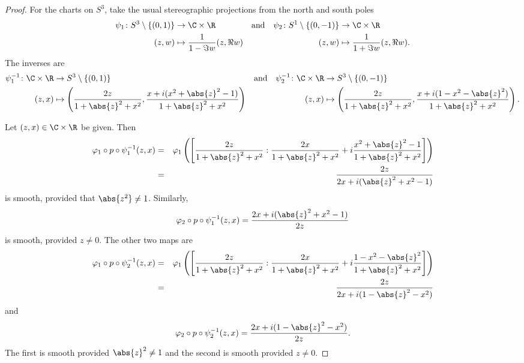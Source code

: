\documentclass[10pt]{amsart}
\begin{document}
\begin{thm}
\begin{proof}
    For the charts on $S^3$, take the usual stereographic projections from the north and south poles
    \begin{align*}
      \psi_1 \colon S^3 \setminus \left\{(0, 1)\right\} &\rightarrow \C \times \R& \text{and} & & \psi_2 \colon S^1 \setminus \left\{(0, -1)\right\} & \rightarrow \C \times \R\\
             (z, w) & \mapsto \frac{1}{1 - \Im{w}}(z, \Re{w}) & & & (z, w) & \mapsto \frac{1}{1 + \Im{w}}(z, \Re{w}).
    \end{align*}
    The inverses are
    \begin{align*}
      \psi_1^{-1} \colon \C \times \R &\rightarrow S^3 \setminus \left\{(0,1)\right\} & \text{and} & & \psi_2^{-1} \colon \C \times \R & \rightarrow S^3 \setminus \left\{(0,-1)\right\}\\
      (z,x) & \mapsto \left(\frac{2z}{1 + \abs{z}^2 + x^2}, \frac{x + i(x^2 + \abs{z}^2 - 1)}{1 + \abs{z}^2 + x^2}\right) & & & (z,x) & \mapsto \left(\frac{2z}{1 + \abs{z}^2 + x^2}, \frac{x + i(1 - x^2 - \abs{z}^2)}{1 + \abs{z}^2 + x^2}\right).%
    \end{align*}

    Let $(z,x) \in \C \times \R$ be given.
    Then 
    \begin{eqnarray*}
      \varphi_1 \circ p \circ \psi_1^{-1}(z,x) &=& \varphi_1\left(\left[\frac{2z}{1 + \abs{z}^2 + x^2} : \frac{2x}{1 + \abs{z}^2 + x^2} + i\frac{x^2 + \abs{z}^2 - 1}{1 + \abs{z}^2 + x^2}\right]\right)\\
      &=& \frac{2z}{2x + i(\abs{z}^2 + x^2 - 1)}
    \end{eqnarray*}
    is smooth, provided that $\abs{z^2} \neq 1$.
    Similarly,
    $$\varphi_2 \circ p \circ \psi_1^{-1}(z,x) = \frac{2x + i(\abs{z}^2 + x^2 - 1)}{2z}$$
    is smooth, provided $z \neq 0$.
    The other two maps are
    \begin{eqnarray*}
      \varphi_1 \circ p \circ \psi_2^{-1}(z,x) &=& \varphi_1\left(\left[\frac{2z}{1 + \abs{z}^2 + x^2} : \frac{2x}{1 + \abs{z}^2 + x^2} + i\frac{1 - x^2 - \abs{z}^2}{1 + \abs{z}^2 + x^2}\right]\right)\\
      &=& \frac{2z}{2x + i(1 - \abs{z}^2 - x^2)}
    \end{eqnarray*}
    and
    $$\varphi_2 \circ p \circ \psi_2^{-1}(z,x) = \frac{2x + i(1 - \abs{z}^2 - x^2)}{2z}.$$
    The first is smooth provided $\abs{z}^2 \neq 1$ and the second is smooth provided $z \neq 0$.
    

\end{proof}
\end{thm}
\end{document}
